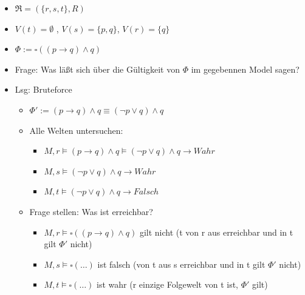 \documentclass[8pt,landscape]{article}
\begin{document}
\begin{multicols}{3}
\begin{itemize}
\item $ \Re = (\{r,s,t\}, R) $
\item $ V(t) = \emptyset $ , $ V(s) = \{p,q\} $, $ V(r) = \{q\} $
\item $ \Phi := \square((p \rightarrow q) \wedge q ) $
\item Frage: Was l\"a\ss{}t sich \"uber die G\"ultigkeit von $ \Phi $ im gegebennen Model sagen?
\item Lsg: Bruteforce
  \begin{itemize}
  \item $ \Phi' := (p \rightarrow q) \wedge q \equiv (\neg p \vee q)\wedge q$
  \item Alle Welten untersuchen:
    \begin{itemize}
    \item $ M,r \models (p \rightarrow q) \wedge q \models (\neg p \vee q) \wedge q \rightarrow Wahr $
    \item $ M,s \models (\neg p \vee q ) \wedge q \rightarrow Wahr $
    \item $ M,t \models (\neg p \vee q ) \wedge q \rightarrow Falsch $
    \end{itemize}
  \item Frage stellen: Was ist erreichbar?
    \begin{itemize}
    \item $ M,r \models \square((p \rightarrow q ) \wedge q) $ gilt nicht (t von r aus erreichbar und in t gilt $ \Phi' $ nicht)
    \item $ M,s \models \square( \ldots ) $ ist falsch (von t aus s erreichbar und in t gilt $ \Phi' $ nicht)
    \item $ M,t \models \square( \ldots ) $ ist wahr (r einzige Folgewelt von t ist, $ \Phi' $ gilt)
    \end{itemize}
  \end{itemize}
\end{itemize}


\end{multicols}
\end{document}
